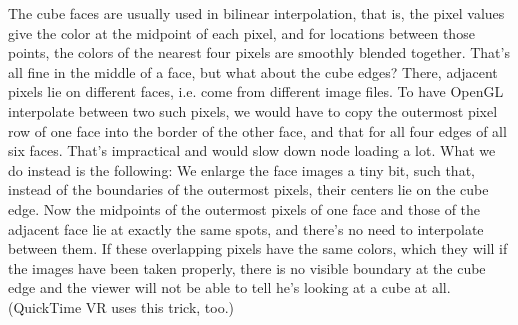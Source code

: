 \documentclass[
	a4paper,
	pagesize,
	10pt,
	oneside,
	idxtotoc,
	bibtotoc,
	BCOR10mm,
	DIV10
]{scrartcl} %
\begin{document}
The cube faces are usually used in bilinear interpolation, that is, the pixel values give the color at the midpoint of each pixel, and for locations between those points, the colors of the nearest four pixels are smoothly blended together. That's all fine in the middle of a face, but what about the cube edges? There, adjacent pixels lie on different faces, i.e. come from different image files. To have OpenGL interpolate between two such pixels, we would have to copy the outermost pixel row of one face into the border of the other face, and that for all four edges of all six faces. That's impractical and would slow down node loading a lot. What we do instead is the following: We enlarge the face images a tiny bit, such that, instead of the boundaries of the outermost pixels, their centers lie on the cube edge. Now the midpoints of the outermost pixels of one face and those of the adjacent face lie at exactly the same spots, and there's no need to interpolate between them. If these overlapping pixels have the same colors, which they will if the images have been taken properly, there is no visible boundary at the cube edge and the viewer will not be able to tell he's looking at a cube at all. (QuickTime VR uses this trick, too.)
\end{document}
